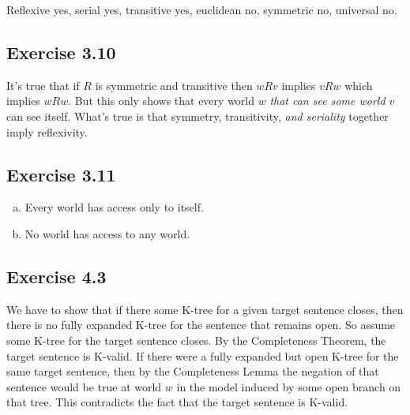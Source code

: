 \documentclass{scrartcl}
\begin{document}
  Reflexive yes,  serial yes, transitive yes,  euclidean no, symmetric
  no, universal no.

\subsection*{Exercise 3.10}

%
%
  It's true that if $R$ is symmetric and transitive then $wRv$ implies
  $vRw$ which implies $wRw$. But this only shows that every world $w$
  \emph{that can see some world $v$} can see itself. What's true is
  that symmetry, transitivity, \emph{and seriality} together imply
  reflexivity.

\subsection*{Exercise 3.11}

%
%
  \begin{enumerate}[(a)]
  \item Every world has access only to itself.
  \item No world has access to any world.
\end{enumerate}

\subsection*{Exercise 4.3}

%
%
  We have to show that if there some K-tree for a given target sentence closes,
  then there is no fully expanded K-tree for the sentence that remains open.
  So assume some K-tree for the target sentence closes. By the Completeness
  Theorem, the target sentence is K-valid. If there were a fully expanded but
  open K-tree for the same target sentence, then by the Completeness Lemma the
  negation of that sentence would be true at world $w$ in the model induced by
  some open branch on that tree. This contradicts the fact that the target
  sentence is K-valid.
\end{document}
